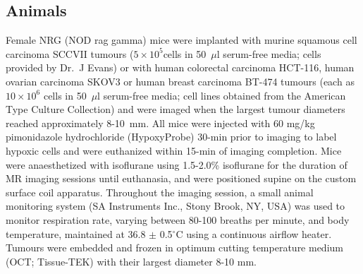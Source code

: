 \subsection{Animals}
Female NRG (NOD rag gamma) mice were implanted with murine squamous cell carcinoma SCCVII tumours ($5\times 10^5$cells in 50~$\mu$l serum-free media; cells provided by Dr.\ J Evans) or with human colorectal carcinoma HCT-116, human ovarian carcinoma SKOV3 or human breast carcinoma BT-474 tumours (each as $10\times10^6$ cells in 50~$\mu$l serum-free media; cell lines obtained from the American Type Culture Collection) and were imaged when the largest tumour diameters reached approximately 8-10~mm.
All mice were injected with 60 mg/kg pimonidazole hydrochloride (HypoxyProbe) 30-min prior to imaging to label hypoxic cells and were euthanized within 15-min of imaging completion.
Mice were anaesthetized with isoflurane using 1.5-2.0\% isoflurane for the duration of MR imaging sessions until euthanasia, and were positioned supine on the custom surface coil apparatus.
Throughout the imaging session, a small animal monitoring system (SA Instruments Inc., Stony Brook, NY, USA) was used to monitor respiration rate, varying between 80-100 breaths per minute, and body temperature, maintained at 36.8 $\pm$ 0.5$^\circ$C using a continuous airflow heater. 
Tumours were embedded and frozen in optimum cutting temperature medium (OCT; Tissue-TEK) with their largest diameter 8-10 mm.


